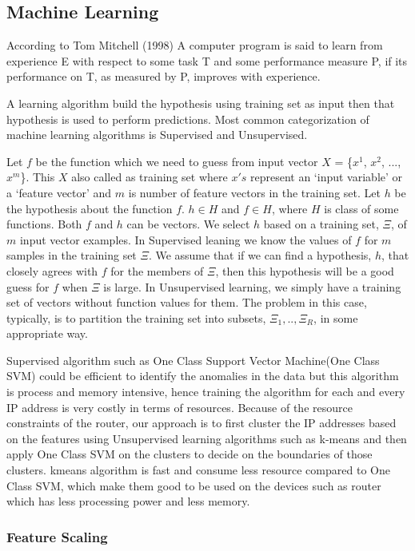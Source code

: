 \documentclass[10pt,oneside,a4paper]{article}
\begin{document}
\subsection{Machine Learning}

According to Tom Mitchell (1998) A computer program is said to learn from experience E with respect to some task T and some performance measure P, if its performance on T, as measured by P, improves with experience.

A learning algorithm build the hypothesis using training set as input then that hypothesis is used to perform predictions. Most common categorization of machine learning algorithms is Supervised and Unsupervised.

Let $f$ be the function which we need to guess from input vector $X$ = \{$x^{1}$, $x^{2}$, ..., $x^{m}$\}. This $X$ also called as training set where $x's$ represent an `input variable' or a `feature vector' and $m$ is number of feature vectors in the training set. Let $h$ be the hypothesis about the function $f$. $h \in H$ and $f \in H$, where $H$ is class of some functions. Both $f$ and $h$ can be vectors. We select $h$ based on a training set, $\Xi$, of $m$ input vector examples. In Supervised leaning we know the values of $f$ for $m$ samples in the training set
$\Xi$. We assume that if we can find a hypothesis, $h$, that closely agrees with $f$ for the members of $\Xi$, then this hypothesis will be a good guess for $f$ when $\Xi$ is large. In Unsupervised learning, we simply have a training set of vectors without function values for them. The problem in this case, typically, is to partition the training set into subsets, $\Xi_1,.. ,\Xi_R$, in some appropriate way.\cite{machineLearning}

Supervised algorithm such as One Class Support Vector Machine(One Class SVM)\cite{SVM} could be efficient to identify the anomalies in the data but this algorithm is process and memory intensive, hence training the algorithm for each and every IP address is very costly in terms of resources. Because of the resource constraints of the router, our approach is to first cluster the IP addresses based on the features using Unsupervised learning algorithms such as k-means and then apply One Class SVM on the clusters to decide on the boundaries of those clusters. kmeans algorithm is fast and consume less resource compared to One Class SVM, which make them good to be used on the devices such as router which has less processing power and less memory.

\subsubsection{Feature Scaling}
\end{document}
